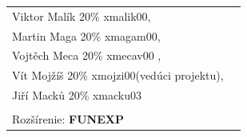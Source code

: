 \begin{titlepage}
\begin{flushleft}
\begin{large}
\begin{tabular}{ll}
Viktor Malík 20\% xmalik00, \\ Martin Maga 20\% xmagam00, \\Vojtěch Meca 20\%  xmecav00 , \\  Vít Mojžíš 20\% xmojzi00(vedúci projektu), \\ Jiří Macků 20\% xmacku03 \\ \\
Rozšírenie:
\textbf{FUNEXP} \\

\end{tabular}
\end{large}
\end{flushleft}
\end{titlepage}
